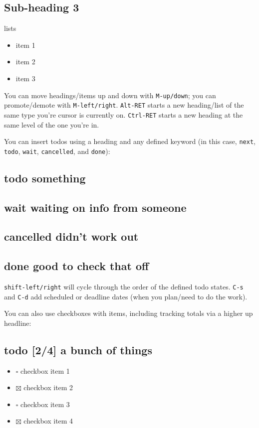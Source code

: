 \documentclass[11pt]{article}
\begin{document}
\subsection*{Sub-heading 3}
\label{sec:orgheadline5}

lists
\begin{itemize}
\item item 1
\item item 2
\item item 3
\end{itemize}

You can move headings/items up and down with \texttt{M-up/down}; you can promote/demote with
\texttt{M-left/right}. \texttt{Alt-RET} starts a new heading/list of the same type you're cursor is
currently on. \texttt{Ctrl-RET} starts a new heading at the same level of the one you're in.

You can insert todos using a heading and any defined keyword (in this case, \texttt{next}, \texttt{todo},
\texttt{wait}, \texttt{cancelled}, and \texttt{done}):

\subsection*{{\bfseries\sffamily todo} something}
\label{sec:orgheadline6}
\subsection*{{\bfseries\sffamily wait} waiting on info from someone}
\label{sec:orgheadline7}
\subsection*{{\bfseries\sffamily cancelled} didn't work out}
\label{sec:orgheadline8}
\subsection*{{\bfseries\sffamily done} good to check that off}
\label{sec:orgheadline9}

\texttt{shift-left/right} will cycle through the order of the defined todo states. \texttt{C-s} and
\texttt{C-d} add scheduled or deadline dates (when you plan/need to do the work).

You can also use checkboxes with items, including tracking totals via a higher up
headline:

\subsection*{{\bfseries\sffamily todo} [2/4] a bunch of things}
\label{sec:orgheadline10}
\begin{itemize}
\item $\square$ checkbox item 1
\item $\boxtimes$ checkbox item 2
\item $\square$ checkbox item 3
\item $\boxtimes$ checkbox item 4
\end{itemize}
\end{document}
